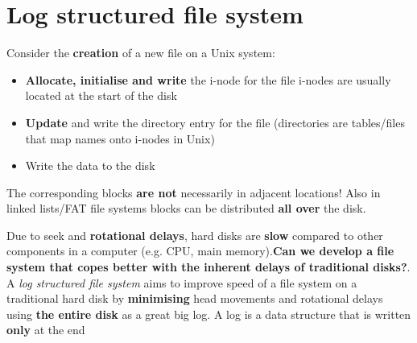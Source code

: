 \documentclass{article}
\begin{document}
\section{Log structured file system}
\begin{flushleft}
Consider the \textbf{creation} of a new file on a Unix system:
\begin{itemize}
	\item \textbf{Allocate, initialise and write} the i-node for the file i-nodes are usually located at the start of the disk
	\item \textbf{Update} and write the directory entry for the file (directories are tables/files that map names onto i-nodes in Unix)
	\item Write the data to the disk 
\end{itemize}
The corresponding blocks \textbf{are not} necessarily in adjacent locations! Also in linked lists/FAT file systems blocks can be distributed \textbf{all over} the disk.
\end{flushleft}
\bigskip
\begin{flushleft}
Due to seek and \textbf{rotational delays}, hard disks are \textbf{slow} compared to other components in a computer (e.g. CPU, main memory).\textbf{Can we develop a file system that copes better with the inherent delays of traditional disks?}.\\
A \textit{log structured file system} aims to improve speed of a file system on a traditional hard disk by \textbf{minimising} head movements and rotational delays using \textbf{the entire disk} as a great big log. A log is a data structure that is written \textbf{only} at the end
\end{flushleft}
\end{document}

